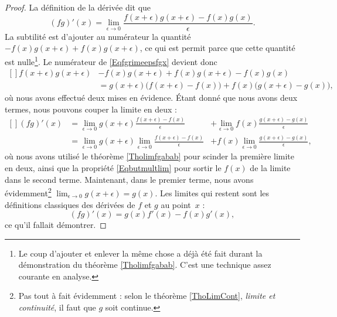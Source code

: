 \begin{proof}
La définition de la dérivée dit que
\begin{equation}        \label{Eqfgrimeepsfgx}
    (fg)'(x)=\lim_{\epsilon\to 0}\frac{f(x+\epsilon)g(x+\epsilon)-f(x)g(x)}{\epsilon}.
\end{equation}
La subtilité est d'ajouter au numérateur la quantité $-f(x)g(x+\epsilon)+f(x)g(x+\epsilon)$, ce qui est permit parce que cette quantité est nulle\footnote{Le coup d'ajouter et enlever la même chose a déjà été fait durant la démonstration du théorème \ref{Tholimfgabab}. C'est une technique assez courante en analyse.}. Le numérateur de \eqref{Eqfgrimeepsfgx} devient donc
\begin{equation}
    \begin{aligned}[]
f(x+\epsilon)g(x+\epsilon)&-f(x)g(x+\epsilon)+f(x)g(x+\epsilon)-f(x)g(x) \\
            &= g(x+\epsilon)\big( f(x+\epsilon)-f(x) \big)+f(x)\big( g(x+\epsilon)-g(x) \big),
    \end{aligned}
\end{equation}
où nous avons effectué deux mises en évidence. Étant donné que nous avons deux termes, nous pouvons couper la limite en deux :
\begin{equation}
    \begin{aligned}[]
        (fg)'(x)    &=\lim_{\epsilon\to 0}g(x+\epsilon)\frac{ f(x+\epsilon)-f(x) }{\epsilon}            &+\lim_{\epsilon\to 0}f(x)\frac{ g(x+\epsilon)-g(x) }{\epsilon}\\
                &=\lim_{\epsilon\to 0}g(x+\epsilon)\lim_{\epsilon\to 0}\frac{ f(x+\epsilon)-f(x) }{\epsilon}    &+f(x)\lim_{\epsilon\to 0}\frac{ g(x+\epsilon)-g(x) }{\epsilon},
    \end{aligned}
\end{equation}
où nous avons utilisé le théorème \ref{Tholimfgabab} pour scinder la première limite en deux, ainsi que la propriété \eqref{Eqbutmultlim} pour sortir le $f(x)$ de la limite dans le second terme. Maintenant, dans le premier terme, nous avons évidemment\footnote{Pas tout à fait évidemment : selon le théorème \ref{ThoLimCont}, \emph{limite et continuité}, il faut que $g$ soit continue.} $\lim_{\epsilon\to 0}g(x+\epsilon)=g(x)$. Les limites qui restent sont les définitions classiques des dérivées de $f$ et $g$ au point~$x$ :
\begin{equation}
    (fg)'(x)=g(x)f'(x)-f(x)g'(x),
\end{equation}
ce qu'il fallait démontrer.
\end{proof}

